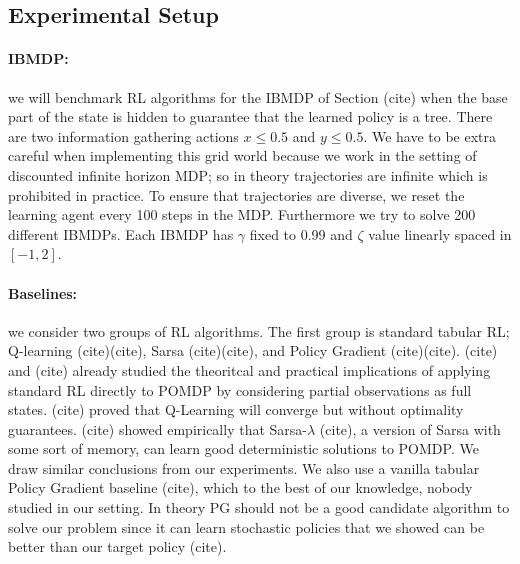 \subsection{Experimental Setup}
\paragraph{IBMDP:} we will benchmark RL algorithms for the IBMDP of Section (cite) when the base part of the state is hidden to guarantee that the learned policy is a tree.
There are two information gathering actions $x\leq0.5$ and $y\leq0.5$.
We have to be extra careful when implementing this grid world because we work in the setting of discounted infinite horizon MDP; so in theory trajectories are infinite which is prohibited in practice.
To ensure that trajectories are diverse, we reset the learning agent every 100 steps in the MDP.
Furthermore we try to solve 200 different IBMDPs. Each IBMDP has $\gamma$ fixed to 0.99 and $\zeta$ value linearly spaced in $[-1, 2]$.
\paragraph{Baselines:} we consider two groups of RL algorithms. The first group is standard tabular RL; Q-learning (cite)(cite), Sarsa (cite)(cite), and Policy Gradient (cite)(cite).
(cite) and (cite) already studied the theoritcal and practical implications of applying standard RL directly to POMDP by considering partial observations as full states.
(cite) proved that Q-Learning will converge but without optimality guarantees. 
(cite) showed empirically that Sarsa-$\lambda$ (cite), a version of Sarsa with some sort of memory, can learn good deterministic solutions to POMDP.
We draw similar conclusions from our experiments. 
We also use a vanilla tabular Policy Gradient baseline (cite), which to the best of our knowledge, nobody studied in our setting.
In theory PG should not be a good candidate algorithm to solve our problem since it can learn stochastic policies that we showed can be better than our target policy (cite).


